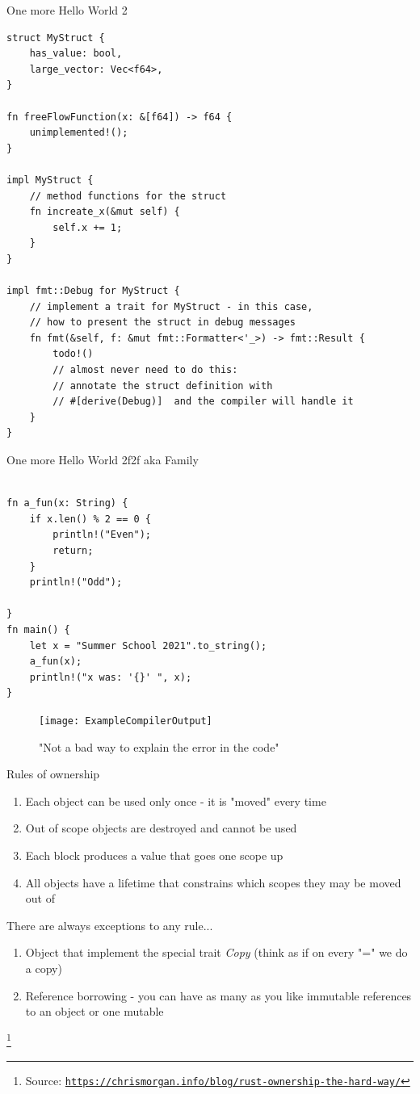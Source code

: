 \documentclass[8pt]{beamer}
\newcommand\blfootnote[1]{%
	\begingroup
	\renewcommand\thefootnote{}\footnote{#1}%
	\addtocounter{footnote}{-1}%
	\endgroup
}
\begin{document}
\begin{frame}[fragile]{One more Hello World 2}
\begin{verbatim}
struct MyStruct {
	has_value: bool,
	large_vector: Vec<f64>,
}

fn freeFlowFunction(x: &[f64]) -> f64 {
	unimplemented!();
}

impl MyStruct {
	// method functions for the struct
	fn increate_x(&mut self) {
		self.x += 1;
	}
}

impl fmt::Debug for MyStruct {
	// implement a trait for MyStruct - in this case, 
	// how to present the struct in debug messages
	fn fmt(&self, f: &mut fmt::Formatter<'_>) -> fmt::Result {
		todo!()
		// almost never need to do this: 
		// annotate the struct definition with 
		// #[derive(Debug)]  and the compiler will handle it
	}
}
\end{verbatim}
\end{frame}


\begin{frame}[fragile]{One more Hello World 2f2f aka Family}
\begin{verbatim}

fn a_fun(x: String) {
	if x.len() % 2 == 0 {
		println!("Even");
		return;
	}
	println!("Odd");
	
}
fn main() {
	let x = "Summer School 2021".to_string();
	a_fun(x);
	println!("x was: '{}' ", x);
}
\end{verbatim}
\pause
\begin{figure}
	\centering
	\texttt{[image: ExampleCompilerOutput]}
	\caption{"Not a bad way to explain the error in the code"}
	\label{fig:examplecompileroutput}
\end{figure}
\end{frame}

\begin{frame}{Rules of ownership}
\begin{enumerate}
	\item Each object can be used only once - it is "moved" every time
	\item Out of scope objects are destroyed and cannot be used
	\item Each block produces a value that goes one scope up
	\item All objects have a lifetime that constrains which scopes they may be moved out of
\end{enumerate}
\pause
There are always exceptions to any rule...
\pause
\begin{enumerate}
	\item Object that implement the special trait \emph{Copy} (think as if on every "=" we do a copy)
	\item Reference borrowing - you can have as many as you like immutable references to an object or one mutable
\end{enumerate}
\blfootnote{Source: \texttt{\url{https://chrismorgan.info/blog/rust-ownership-the-hard-way/}}}
\end{frame}
\end{document}
